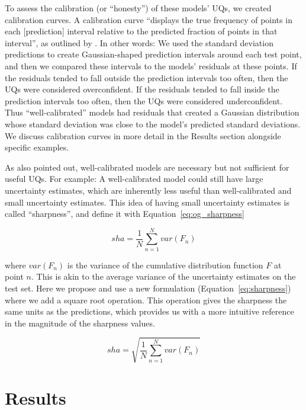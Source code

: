 \documentclass[]{achemso}
\begin{document}
To assess the calibration (or ``honesty'') of these models' UQs, we created calibration curves. A calibration curve ``displays the true frequency of points in each [prediction] interval relative to the predicted fraction of points in that interval'', as outlined by \citet{Kuleshov2018}.
In other words:  We used the standard deviation predictions to create Gaussian-shaped prediction intervals around each test point, and then we compared these intervals to the models' residuals at these points.
If the residuals tended to fall outside the prediction intervals too often, then the UQs were considered overconfident.
If the residuals tended to fall inside the prediction intervals too often, then the UQs were considered underconfident.
Thus ``well-calibrated'' models had residuals that created a Gaussian distribution whose standard deviation was close to the model's predicted standard deviations.
We discuss calibration curves in more detail in the Results section alongside specific examples.

As \citet{Kuleshov2018} also pointed out, well-calibrated models are necessary but not sufficient for useful UQs.
For example:  A well-calibrated model could still have large uncertainty estimates, which are inherently less useful than well-calibrated and small uncertainty estimates.
This idea of having small uncertainty estimates is called ``sharpness'', and \citet{Kuleshov2018} define it with Equation~\ref{eq:og_sharpness}

\begin{equation}\label{eq:og_sharpness}
    sha = \frac{1}{N} \sum_{n=1}^{N} var(F_n)
\end{equation}

\noindent where $var(F_n)$ is the variance of the cumulative distribution function $F$ at point $n$.
This is akin to the average variance of the uncertainty estimates on the test set.
Here we propose and use a new formulation (Equation~\ref{eq:sharpness}) where we add a square root operation.
This operation gives the sharpness the same units as the predictions, which provides us with a more intuitive reference in the magnitude of the sharpness values.

\begin{equation}\label{eq:sharpness}
    sha = \sqrt{\frac{1}{N} \sum_{n=1}^{N} var(F_n)}
\end{equation}



\section{Results}
\end{document}
